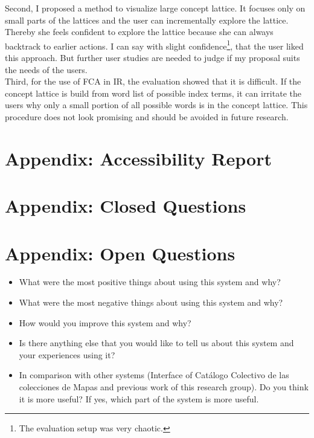 \documentclass[11pt]{report}
\begin{document}
Second, I proposed a method to visualize large concept lattice. It focuses only on small parts of the lattices and the user can incrementally explore the lattice. Thereby she feels confident to explore the lattice because she can always backtrack to earlier actions. I can say with slight confidence\footnote{The evaluation setup was very chaotic.}, that the user liked this approach. But further user studies are needed to judge if my proposal suits the needs of the users. \\

Third, for the use of FCA in IR, the evaluation showed that it is difficult. If the concept lattice is build from word list of possible index terms, it can irritate the users why only a small portion of all possible words is in the concept lattice. This procedure does not look promising and should be avoided in future research.
\newpage



\newpage
\appendix
\chapter{Appendix: Accessibility Report}
\label{app:access}



\chapter{Appendix: Closed Questions}
\label{app:closed}



\chapter{Appendix: Open Questions}
\label{app:open}

\begin{itemize}
	\item What were the most positive things about using this system and why?
	\item What were the most negative things about using this system and why?
	\item How would you improve this system and why?
	\item Is there anything else that you would like to tell us about this system and your experiences using it?
	\item In comparison with other systems (Interface of Catálogo Colectivo de las colecciones de Mapas and previous work of this research group).
Do you think it is more useful? If yes, which part of the system is more useful.
\end{itemize}
\end{document}
